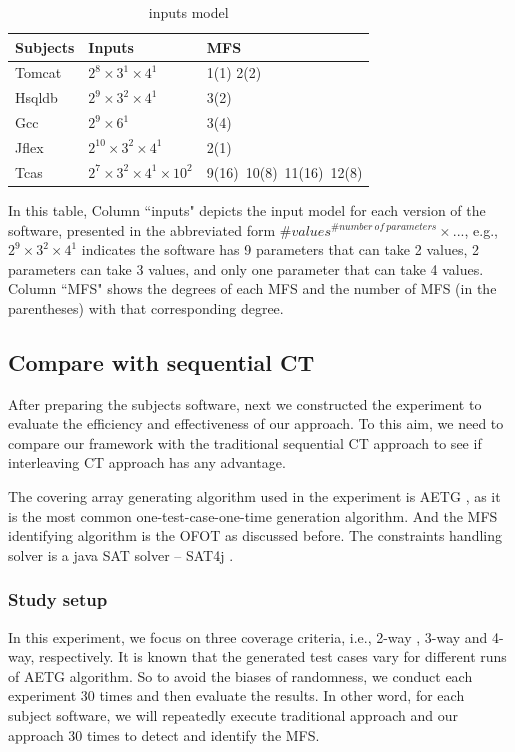 \documentclass{sig-alternate}
\begin{document}
\begin{table}[ht]
\caption{inputs model }
\label{inputs}
\center
\begin{tabular}{l|l|l}
\hline
Subjects & Inputs & MFS \\
\hline
Tomcat   &  $2^{8} \times 3^{1} \times 4^{1}$       & 1(1) 2(2)  \\
Hsqldb   &   $2^{9} \times 3^{2} \times 4^{1}$      &  3(2) \\
Gcc      &   $2^{9} \times 6^{1}$      &    3(4)  \\
Jflex    & $2^{10} \times 3^{2} \times 4^{1} $        &   2(1)   \\
Tcas     &  $2^{7} \times 3^{2} \times 4^{1} \times 10^{2} $ &9(16)\ 10(8)\ 11(16)\ 12(8) \\ \hline
\end{tabular}

\end{table}
In this table, Column ``inputs" depicts the input model for each version of the software, presented in the abbreviated form $\#values^{\#number\ of\ parameters} \times ...$, e.g., $2^{9} \times 3^{2} \times 4^{1}$ indicates the software has 9 parameters that can take 2 values, 2 parameters can take 3 values, and only one parameter that can take 4 values. Column ``MFS" shows the degrees of each MFS and the number of MFS (in the parentheses) with that corresponding degree.

\subsection{Compare with sequential CT}

After preparing the subjects software, next we constructed the experiment to evaluate the efficiency and effectiveness of our approach. To this aim, we need to compare our framework with the traditional sequential CT approach to see if interleaving CT approach has any advantage.

The covering array generating algorithm used in the experiment is AETG \cite{cohen1997aetg}, as it is the most common one-test-case-one-time generation algorithm. And the MFS identifying algorithm is the OFOT \cite{nie2011minimal} as discussed before. The constraints handling solver is a java SAT solver -- SAT4j \cite{le2010sat4j}.


\subsubsection{Study setup}
In this experiment, we focus on three coverage criteria, i.e., 2-way , 3-way and 4-way, respectively. It is known that the generated test cases vary for different runs of AETG algorithm. So to avoid the biases of randomness, we conduct each experiment 30 times and then evaluate the results.  In other word, for each subject software, we will repeatedly execute traditional approach and our approach 30 times to detect and identify the MFS.
\end{document}
